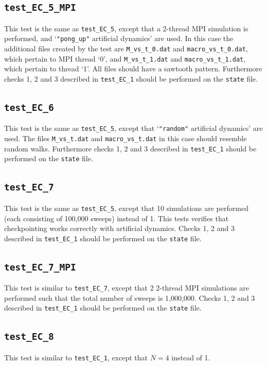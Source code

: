 \documentclass{report}
\begin{document}
\subsection{\texttt{test\_EC\_5\_MPI}}
This test is the same as \texttt{test\_EC\_5}, except that a 2-thread MPI simulation is performed, and `\texttt{"pong\_up"}
artificial dynamics' are used. In this case the additional files created by the test are \texttt{M\_vs\_t\_0.dat} and 
\texttt{macro\_vs\_t\_0.dat}, which pertain to MPI thread `0', and \texttt{M\_vs\_t\_1.dat} and \texttt{macro\_vs\_t\_1.dat},
which pertain to thread `1'. All files should have a sawtooth pattern.
Furthermore checks 1, 2 and 3 described in \texttt{test\_EC\_1} should be performed on the \texttt{state} file.


\subsection{\texttt{test\_EC\_6}}
This test is the same as \texttt{test\_EC\_5}, except that `\texttt{"random"} artificial dynamics' are used. The files 
\texttt{M\_vs\_t.dat} and \texttt{macro\_vs\_t.dat} in this case should resemble random walks.
Furthermore checks 1, 2 and 3 described in \texttt{test\_EC\_1} should be performed on the \texttt{state} file.


\subsection{\texttt{test\_EC\_7}}
This test is the same as \texttt{test\_EC\_5}, except that 10 simulations are performed (each consisting of 100,000
sweeps) instead of 1. This tests verifies that checkpointing works correctly with artificial dynamics.
Checks 1, 2 and 3 described in \texttt{test\_EC\_1} should be performed on the \texttt{state} file.


\subsection{\texttt{test\_EC\_7\_MPI}}
This test is similar to \texttt{test\_EC\_7}, except that 2 2-thread MPI simulations are performed such that the total
number of sweeps is 1,000,000.
Checks 1, 2 and 3 described in \texttt{test\_EC\_1} should be performed on the \texttt{state} file.


\subsection{\texttt{test\_EC\_8}}
This test is similar to \texttt{test\_EC\_1}, except that $N=4$ instead of 1.
\end{document}
